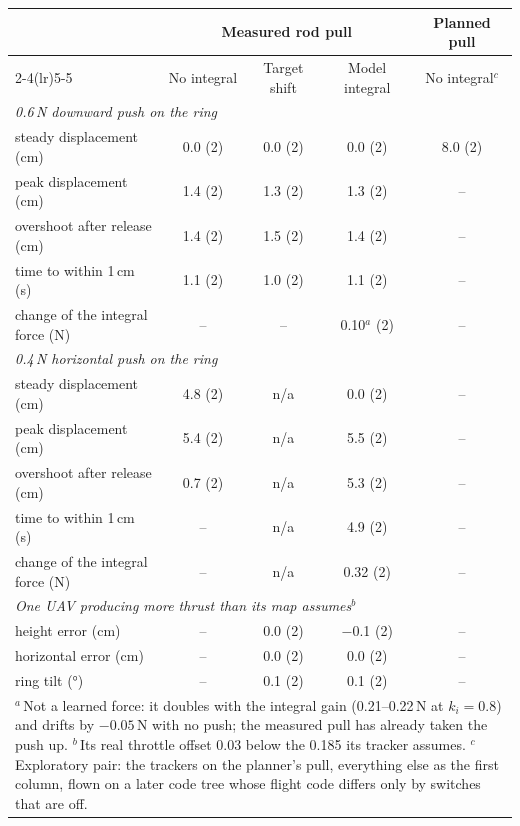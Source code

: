 \footnotesize
\setlength{\tabcolsep}{4pt}
\begin{tabular}{lcccc}
\toprule
 & \multicolumn{3}{c}{Measured rod pull} & Planned pull \\
\cmidrule(lr){2-4}\cmidrule(lr){5-5}
 & No integral & Target shift & Model integral & No integral$^c$ \\
\midrule
\multicolumn{5}{l}{\emph{0.6\,N downward push on the ring}} \\
\quad steady displacement (cm) & 0.0 (2) & 0.0 (2) & 0.0 (2) & 8.0 (2) \\
\quad peak displacement (cm) & 1.4 (2) & 1.3 (2) & 1.3 (2) & -- \\
\quad overshoot after release (cm) & 1.4 (2) & 1.5 (2) & 1.4 (2) & -- \\
\quad time to within 1\,cm (s) & 1.1 (2) & 1.0 (2) & 1.1 (2) & -- \\
\quad change of the integral force (N) & -- & -- & 0.10$^a$ (2) & -- \\
\midrule
\multicolumn{5}{l}{\emph{0.4\,N horizontal push on the ring}} \\
\quad steady displacement (cm) & 4.8 (2) & n/a & 0.0 (2) & -- \\
\quad peak displacement (cm) & 5.4 (2) & n/a & 5.5 (2) & -- \\
\quad overshoot after release (cm) & 0.7 (2) & n/a & 5.3 (2) & -- \\
\quad time to within 1\,cm (s) & -- & n/a & 4.9 (2) & -- \\
\quad change of the integral force (N) & -- & n/a & 0.32 (2) & -- \\
\midrule
\multicolumn{5}{l}{\emph{One UAV producing more thrust than its map assumes$^b$}} \\
\quad height error (cm) & -- & 0.0 (2) & $-$0.1 (2) & -- \\
\quad horizontal error (cm) & -- & 0.0 (2) & 0.0 (2) & -- \\
\quad ring tilt (\si{\degree}) & -- & 0.1 (2) & 0.1 (2) & -- \\
\bottomrule
\multicolumn{5}{p{0.95\textwidth}}{\footnotesize $^a$\,Not a learned force: it doubles with the integral gain
(0.21--0.22\,N at $k_i = 0.8$) and drifts by $-0.05$\,N with no push; the measured pull has already taken the push
up. $^b$\,Its real throttle offset 0.03 below the 0.185 its tracker assumes. $^c$\,Exploratory pair: the trackers on
the planner's pull, everything else as the first column, flown on a later code tree whose flight code differs only by
switches that are off.}
\end{tabular}
